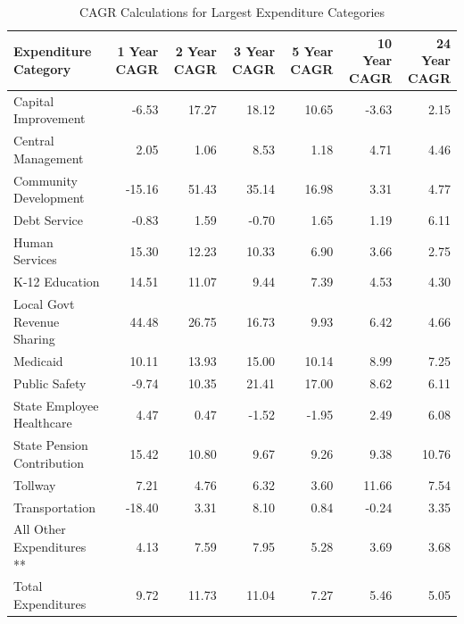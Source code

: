 \documentclass[
  letterpaper,
  DIV=11,
  numbers=noendperiod]{scrreport}
\begin{document}
\begin{table}

\caption{CAGR Calculations for Largest Expenditure Categories}
\centering
\begin{tabular}[t]{l|r|r|r|r|r|r}
\hline
Expenditure Category & 1 Year CAGR & 2 Year CAGR & 3 Year CAGR & 5 Year CAGR & 10 Year CAGR & 24 Year CAGR\\
\hline
Capital Improvement & -6.53 & 17.27 & 18.12 & 10.65 & -3.63 & 2.15\\
\hline
Central Management & 2.05 & 1.06 & 8.53 & 1.18 & 4.71 & 4.46\\
\hline
Community Development & -15.16 & 51.43 & 35.14 & 16.98 & 3.31 & 4.77\\
\hline
Debt Service & -0.83 & 1.59 & -0.70 & 1.65 & 1.19 & 6.11\\
\hline
Human Services & 15.30 & 12.23 & 10.33 & 6.90 & 3.66 & 2.75\\
\hline
K-12 Education & 14.51 & 11.07 & 9.44 & 7.39 & 4.53 & 4.30\\
\hline
Local Govt Revenue Sharing & 44.48 & 26.75 & 16.73 & 9.93 & 6.42 & 4.66\\
\hline
Medicaid & 10.11 & 13.93 & 15.00 & 10.14 & 8.99 & 7.25\\
\hline
Public Safety & -9.74 & 10.35 & 21.41 & 17.00 & 8.62 & 6.11\\
\hline
State Employee Healthcare & 4.47 & 0.47 & -1.52 & -1.95 & 2.49 & 6.08\\
\hline
State Pension Contribution & 15.42 & 10.80 & 9.67 & 9.26 & 9.38 & 10.76\\
\hline
Tollway & 7.21 & 4.76 & 6.32 & 3.60 & 11.66 & 7.54\\
\hline
Transportation & -18.40 & 3.31 & 8.10 & 0.84 & -0.24 & 3.35\\
\hline
All Other Expenditures ** & 4.13 & 7.59 & 7.95 & 5.28 & 3.69 & 3.68\\
\hline
Total Expenditures & 9.72 & 11.73 & 11.04 & 7.27 & 5.46 & 5.05\\
\hline
\end{tabular}
\end{table}
\end{document}
